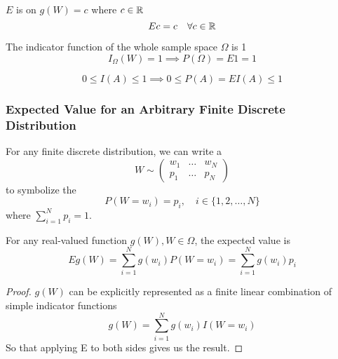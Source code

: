 \documentclass[11pt]{article}
\numberwithin{equation}{section}
\begin{document}
$E$ is  on $g(W) = c$ where $c \in \mathbb{R}$
\begin{equation}
	Ec = c \quad \forall c \in \mathbb{R}
\end{equation}

\property
The indicator function of the whole sample space $\Omega$ is 1
\begin{equation}
	I_\Omega(W) = 1 \implies P(\Omega) = E1 = 1
\end{equation}

\begin{equation}
	0 \leq I(A) \leq 1 \implies 0\leq P(A) = EI(A) \leq 1
\end{equation}

\subsubsection{Expected Value for an Arbitrary Finite Discrete Distribution}
 For any finite discrete distribution, we can write a  
\begin{equation}
	W \sim \begin{pmatrix}
		w_1 & \hdots & w_N\\
		p_1 & \hdots & p_N
	\end{pmatrix}
\end{equation}
to symbolize the 
$$P(W = w_i) = p_i, \quad i \in \{1, 2, \hdots, N\}$$
where $\sum_{i=1}^Np_i = 1$.

\corollary
For any real-valued function $g(W), W \in \Omega$, the expected value is
\begin{equation}
	Eg(W) = \sum_{i=1}^Ng(w_i)P(W = w_i) = \sum_{i=1}^Ng(w_i)p_i
\end{equation}
\begin{proof}
	$g(W)$ can be explicitly represented as a finite linear combination of simple indicator functions
	$$g(W) = \sum_{i=1}^N g(w_i)I(W = w_i)$$
	So that applying E to both sides gives us the result.
\end{proof}
\end{document}
